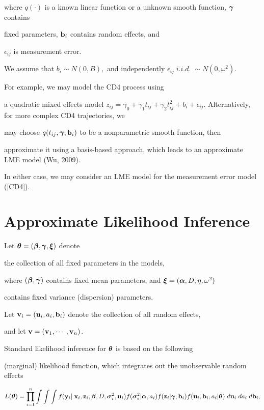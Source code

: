 \documentclass[12pt]{article}
\newcommand{\btheta}{\mbox{\boldmath $\theta$}}
\newcommand{\balpha}{\mbox{\boldmath $\alpha$}}
\newcommand{\bgamma}{\mbox{\boldmath $\gamma$}}
\newcommand{\bbeta}{\mbox{\boldmath $\beta$}}
\newcommand{\bxi}{\mbox{\boldmath $\xi$}}
\newcommand{\bsigma}{\mbox{\boldmath $\sigma$}}
\begin{document}
where $q(\cdot)$ is a known linear function or a unknown smooth function, $\bgamma$ contains 

fixed parameters, ${\bf b}_i$ contains random effects, and 

$\epsilon_{ij}$ is measurement error. 

We assume that $b_i \sim N(0, B),$ and independently $ \epsilon_{ij} \; i.i.d. \; \sim N(0,

\omega^2)$.



For example, we may model the CD4 process using 

a quadratic mixed effects model ${z}_{ij} = \gamma_0+\gamma_1 t_{ij} + \gamma_2 t_{ij}^2

     + b_i + \epsilon_{ij}$. Alternatively, for more complex CD4 trajectories, we 

may choose $q(t_{ij}, \bgamma, {\bf b}_i)$ to be a nonparametric smooth function, then 

approximate it using a basis-based approach, which leads to an approximate LME model (Wu, 2009). 

In either case, we may consider an LME model for the  measurement error model (\ref{CD4}). 



\section{Approximate Likelihood Inference}



    Let $\btheta = (\bbeta, \bgamma, \bxi)$ denote 

the collection of all fixed parameters in the models, 

where $(\bbeta, \bgamma)$ contains fixed mean parameters, and $\bxi = (\balpha, D, \eta, 

\omega^2)$ 

contains fixed variance (dispersion) parameters. 

Let ${\bf v}_i = ({\bf u}_i, a_i, {\bf b}_i)$ denote the collection of all random effects, 

and let ${\bf v} = ({\bf v}_1, \cdots, {\bf v}_n)$. 

Standard likelihood inference for $\btheta$ is based on the following 

(marginal) likelihood function, which integrates out the unobservable random effects  

\begin{eqnarray*}

 L(\btheta) = \prod_{i=1}^n \int\int\int f({\bf y}_i | \; {\bf x}_i, {\bf z}_i, 

  \bbeta, D, \bsigma^2_{i}, {\bf u}_i)

  f(\bsigma^2_{i} | \balpha, a_i) f({\bf z}_i | \bgamma, {\bf b}_i) f({\bf u}_i, {\bf b}_i, a_i |

\btheta) \; d {\bf u}_i \; da_i \; d{\bf b}_i,     



\end{eqnarray*} 
\end{document}
